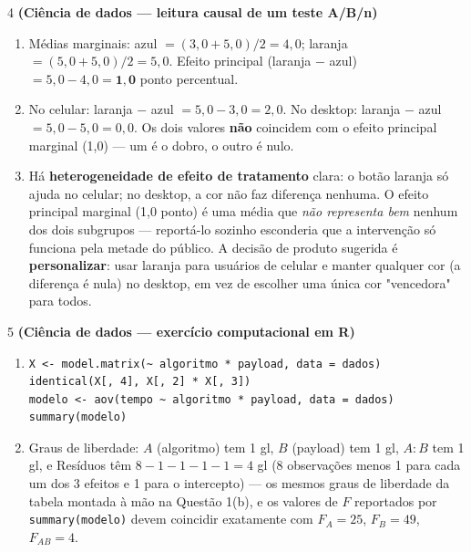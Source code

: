 \documentclass[11pt]{article}
\begin{document}
\begin{questao}{4} \textbf{(Ciência de dados --- leitura causal de um teste A/B/n)}
\end{questao}
\begin{solucao}
\begin{enumerate}[label=(\alph*)]
  \item Médias marginais: azul $= (3{,}0+5{,}0)/2 = 4{,}0$; laranja $=(5{,}0+5{,}0)/2=5{,}0$.
    Efeito principal (laranja $-$ azul) $= 5{,}0-4{,}0 = \mathbf{1{,}0}$ ponto percentual.
  \item No celular: laranja $-$ azul $=5{,}0-3{,}0=2{,}0$. No desktop: laranja $-$ azul
    $=5{,}0-5{,}0=0{,}0$. Os dois valores \textbf{não} coincidem com o efeito principal
    marginal (1,0) --- um é o dobro, o outro é nulo.
  \item Há \textbf{heterogeneidade de efeito de tratamento} clara: o botão laranja só ajuda no
    celular; no desktop, a cor não faz diferença nenhuma. O efeito principal marginal (1,0 ponto)
    é uma média que \emph{não representa bem} nenhum dos dois subgrupos --- reportá-lo sozinho
    esconderia que a intervenção só funciona pela metade do público. A decisão de produto sugerida
    é \textbf{personalizar}: usar laranja para usuários de celular e manter qualquer cor (a
    diferença é nula) no desktop, em vez de escolher uma única cor "vencedora" para todos.
\end{enumerate}
\end{solucao}

\begin{questao}{5} \textbf{(Ciência de dados --- exercício computacional em R)}
\end{questao}
\begin{solucao}
\begin{enumerate}[label=(\alph*)]
  \item
  \begin{lstlisting}
X <- model.matrix(~ algoritmo * payload, data = dados)
identical(X[, 4], X[, 2] * X[, 3])
modelo <- aov(tempo ~ algoritmo * payload, data = dados)
summary(modelo)
  \end{lstlisting}
  \item Graus de liberdade: $A$ (algoritmo) tem 1 gl, $B$ (payload) tem 1 gl, $A{:}B$ tem 1 gl, e
    Resíduos têm $8 - 1 - 1 - 1 - 1 = 4$ gl (8 observações menos 1 para cada um dos 3 efeitos e 1
    para o intercepto) --- os mesmos graus de liberdade da tabela montada à mão na Questão 1(b),
    e os valores de $F$ reportados por \texttt{summary(modelo)} devem coincidir exatamente com
    $F_A=25$, $F_B=49$, $F_{AB}=4$.
\end{enumerate}
\end{solucao}
\end{document}
